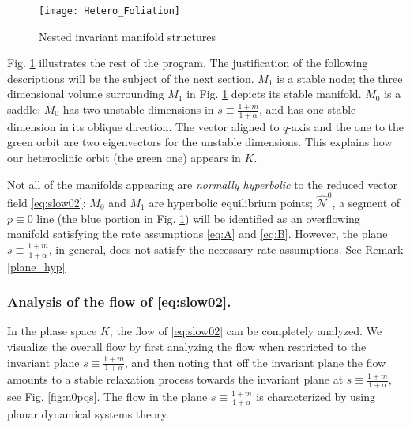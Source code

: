 \documentclass[11pt]{article}
\theoremstyle{remark}
\begin{document}
\begin{figure}[ht]
 \centering
 \texttt{[image: Hetero\_Foliation]}
  \caption{Nested invariant manifold structures} \label{fig:HF}
\end{figure}
Fig. \ref{fig:HF} illustrates the rest of the program. The justification of the following descriptions will be the subject of the next section. $M_1$ is a stable node; the three dimensional volume surrounding $M_1$ in Fig. \ref{fig:HF} depicts its stable manifold. $M_0$ is a saddle; $M_0$ has two unstable dimensions in $s\equiv\tfrac{1+m}{1+\alpha}$, and has one stable dimension in its oblique direction. The vector aligned to $q$-axis and the one to the green orbit are two eigenvectors for the unstable dimensions. This explains how our heteroclinic orbit (the green one) appears in $K$. %

Not all of the manifolds appearing are {\it normally hyperbolic} to the reduced vector field \eqref{eq:slow02}: $M_0$ and $M_1$ are hyperbolic equilibrium points; $\hat{\mathcal{N}}^0$, a segment of $p\equiv0$ line (the blue portion in Fig. \ref{fig:HF}) will be identified as an overflowing manifold satisfying the rate assumptions \eqref{eq:A} and \eqref{eq:B}. However,
the plane $s\equiv \tfrac{1+m}{1+\alpha}$, in general, does not satisfy the necessary rate assumptions. See Remark \ref{plane_hyp}



\subsubsection{Analysis of the flow of  \eqref{eq:slow02}.}%

In the phase space $K$, the flow of \eqref{eq:slow02} can be completely analyzed. We visualize the overall flow by first analyzing the flow when restricted to the invariant plane $s\equiv\tfrac{1+m}{1+\alpha}$, and then noting that off the invariant plane the flow amounts to a stable  relaxation process towards the invariant plane at
$s\equiv\tfrac{1+m}{1+\alpha}$,  see Fig. \ref{fig:n0pqs}. The flow in the plane $s\equiv\tfrac{1+m}{1+\alpha}$ is characterized by using planar dynamical systems theory.
\end{document}
